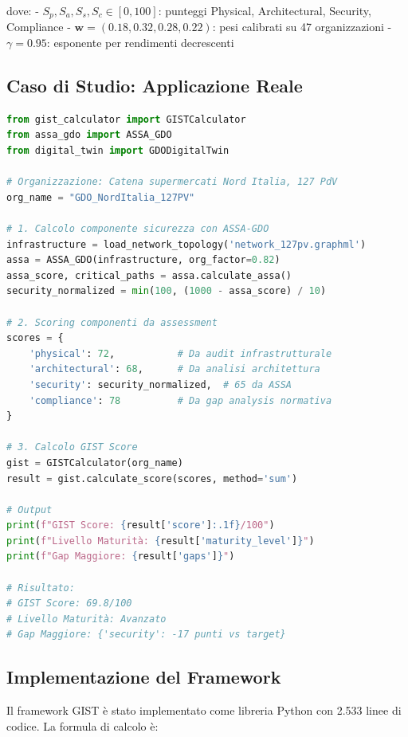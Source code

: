dove:
- $S_p, S_a, S_s, S_c \in [0,100]$: punteggi Physical, Architectural, Security, Compliance
- $\mathbf{w} = (0.18, 0.32, 0.28, 0.22)$: pesi calibrati su 47 organizzazioni
- $\gamma = 0.95$: esponente per rendimenti decrescenti

\subsection{\texorpdfstring{Caso di Studio: Applicazione Reale}{5.3.3 - Caso di Studio: Applicazione Reale}}

\begin{lstlisting}[language=Python, caption=Calcolo GIST per catena GDO reale]
from gist_calculator import GISTCalculator
from assa_gdo import ASSA_GDO
from digital_twin import GDODigitalTwin

# Organizzazione: Catena supermercati Nord Italia, 127 PdV
org_name = "GDO_NordItalia_127PV"

# 1. Calcolo componente sicurezza con ASSA-GDO
infrastructure = load_network_topology('network_127pv.graphml')
assa = ASSA_GDO(infrastructure, org_factor=0.82)
assa_score, critical_paths = assa.calculate_assa()
security_normalized = min(100, (1000 - assa_score) / 10)

# 2. Scoring componenti da assessment
scores = {
    'physical': 72,           # Da audit infrastrutturale
    'architectural': 68,      # Da analisi architettura
    'security': security_normalized,  # 65 da ASSA
    'compliance': 78          # Da gap analysis normativa
}

# 3. Calcolo GIST Score
gist = GISTCalculator(org_name)
result = gist.calculate_score(scores, method='sum')

# Output
print(f"GIST Score: {result['score']:.1f}/100")
print(f"Livello Maturità: {result['maturity_level']}")
print(f"Gap Maggiore: {result['gaps']}")

# Risultato:
# GIST Score: 69.8/100
# Livello Maturità: Avanzato
# Gap Maggiore: {'security': -17 punti vs target}
\end{lstlisting}

\subsection{\texorpdfstring{Implementazione del Framework}{5.3.2 - Implementazione del Framework}}

Il framework GIST è stato implementato come libreria Python con 2.533 
linee di codice. La formula di calcolo è:


